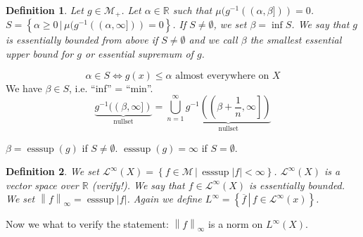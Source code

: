 \documentclass{article}
\newtheorem{definition}{Definition}  \numberwithin{definition}{section}
\newcommand{\setdef}[2]{\left\{\left.#1\,\right|\,#2\right\}}
\newcommand{\norm}[1]{\left\|#1\right\|}
\newcommand{\card}[1]{\left|#1\right|}
\begin{document}
\begin{definition}
  Let $g \in \mathcal M_+$. Let $\alpha \in \mathbb R$ such that $\mu(g^{-1}((\alpha, \beta])) = 0$. $S = \setdef{\alpha \geq 0}{\mu(g^{-1}((\alpha, \infty])) = 0}$.
  If $S \neq \emptyset$, we set $\beta = \inf S$. We say that $g$ is essentially bounded from above if $S \neq \emptyset$ and we call $\beta$ the \emph{smallest essential upper bound for $g$} or \emph{essential supremum of $g$}.
\end{definition}

\[ \alpha \in S \iff g(x) \leq \alpha \text{ almost everywhere on } X \]
We have $\beta \in S$, i.e. \enquote{inf} = \enquote{min}.
\[ \underbrace{g^{-1}((\beta, \infty])}_{\text{nullset}} = \bigcup_{n=1}^\infty \underbrace{g^{-1}\left(\left(\beta + \frac1n, \infty\right]\right)}_{\text{nullset}} \]

$\beta = \operatorname{esssup}(g)$ if $S \neq \emptyset$. $\operatorname{esssup}(g) = \infty$ if $S = \emptyset$.

\begin{definition}
  We set $\mathcal L^\infty(X) = \setdef{f \in \mathcal M}{\operatorname{esssup}\card{f} < \infty}$.
  $\mathcal L^\infty(X)$ is a vector space over $\mathbb R$ (verify!).
  We say that $f \in \mathcal L^\infty(X)$ is essentially bounded.
  We set $\norm{f}_\infty = \operatorname{esssup}\card{f}$.
  Again we define $L^\infty = \setdef{\overline{f}}{f \in \mathcal L^\infty(x)}$.
\end{definition}

Now we what to verify the statement: $\norm{f}_\infty$ is a norm on $L^{\infty}(X)$.
\end{document}
